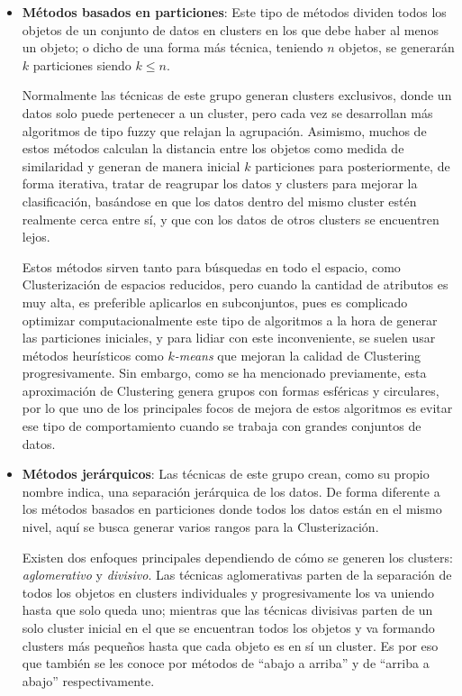\documentclass[3p,twocolumn]{elsarticle}
\begin{document}
\begin{itemize}
  \item \textbf{Métodos basados en particiones}: Este tipo de métodos dividen todos los objetos de un conjunto de datos en clusters en los que debe haber al menos un objeto; o dicho de una forma más técnica, teniendo $n$ objetos, se generarán $k$ particiones siendo $k \leq n$. 
  
  Normalmente las técnicas de este grupo generan clusters exclusivos, donde un datos solo puede pertenecer a un cluster, pero cada vez se desarrollan más algoritmos de tipo fuzzy que relajan la agrupación. Asimismo, muchos de estos métodos calculan la distancia entre los objetos como medida de similaridad y generan de manera inicial $k$ particiones para posteriormente, de forma iterativa, tratar de reagrupar los datos y clusters para mejorar la clasificación, basándose en que los datos dentro del mismo cluster estén realmente cerca entre sí, y que con los datos de otros clusters se encuentren lejos. 
  
  Estos métodos sirven tanto para búsquedas en todo el espacio, como Clusterización de espacios reducidos, pero cuando la cantidad de atributos es muy alta, es preferible aplicarlos en subconjuntos, pues es complicado optimizar computacionalmente este tipo de algoritmos a la hora de generar las particiones iniciales, y para lidiar con este inconveniente, se suelen usar métodos heurísticos como \textit{$k$-means} que mejoran la calidad de Clustering progresivamente. Sin embargo, como se ha mencionado previamente, esta aproximación de Clustering genera grupos con formas esféricas y circulares, por lo que uno de los principales focos de mejora de estos algoritmos es evitar ese tipo de comportamiento cuando se trabaja con grandes conjuntos de datos.
  
  \item \textbf{Métodos jerárquicos}: Las técnicas de este grupo crean, como su propio nombre indica, una separación jerárquica de los datos. De forma diferente a los métodos basados en particiones donde todos los datos están en el mismo nivel, aquí se busca generar varios rangos para la Clusterización. 
  
  Existen dos enfoques principales dependiendo de cómo se generen los clusters: \textit{aglomerativo} y \textit{divisivo}. Las técnicas aglomerativas parten de la separación de todos los objetos en clusters individuales y progresivamente los va uniendo hasta que solo queda uno; mientras que las técnicas divisivas parten de un solo cluster inicial en el que se encuentran todos los objetos y va formando clusters más pequeños hasta que cada objeto es en sí un cluster. Es por eso que también se les conoce por métodos de ``abajo a arriba'' y de ``arriba a abajo'' respectivamente.
  

\end{itemize}
\end{document}
